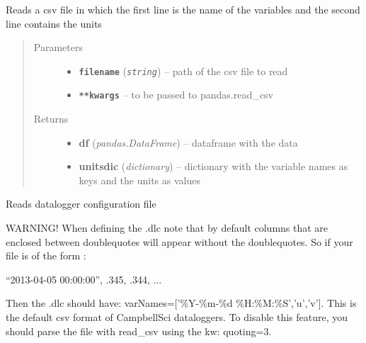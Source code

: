\documentclass[a4paper,10pt,oneside]{sphinxmanual}
\begin{document}
\begin{fulllineitems}
\label{pymicra:pymicra.io.readUnitsCsv}
Reads a csv file in which the first line is the name of the variables
and the second line contains the units
\begin{quote}\begin{description}
\item[{Parameters}] \leavevmode\begin{itemize}
\item {} 
\textbf{\texttt{filename}} (\emph{\texttt{string}}) -- path of the csv file to read

\item {} 
\textbf{\texttt{**kwargs}} -- to be passed to pandas.read\_csv

\end{itemize}

\item[{Returns}] \leavevmode
\begin{itemize}
\item {} 
\textbf{df} (\emph{pandas.DataFrame}) -- dataframe with the data

\item {} 
\textbf{unitsdic} (\emph{dictionary}) -- dictionary with the variable names as keys and the units as values

\end{itemize}


\end{description}\end{quote}

\end{fulllineitems}


\begin{fulllineitems}
\label{pymicra:pymicra.io.read_dlc}
Reads datalogger configuration file

WARNING! When defining the .dlc note that by default columns that are enclosed between doublequotes
will appear without the doublequotes. So if your file is of the form :

``2013-04-05 00:00:00'', .345, .344, ...

Then the .dlc should have: varNames={[}'\%Y-\%m-\%d \%H:\%M:\%S','u','v'{]}. This is the default csv format of
CampbellSci dataloggers. To disable this feature, you should parse the file with read\_csv using the kw: quoting=3.

\end{fulllineitems}
\end{document}

